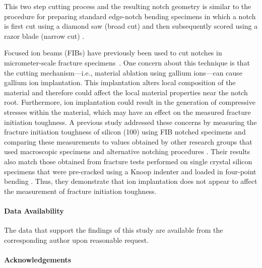 \documentclass[12pt,onecolumn]{article}
\begin{document}
\begin{bibunit}
This two step cutting process and the resulting notch geometry is similar to the procedure for preparing standard edge-notch bending specimens in which a notch is first cut using a diamond saw (broad cut) and then subsequently scored using a razor blade (narrow cut) \cite{rocha2006effect,kubler1997fracture,damani1996critical}.

Focused ion beams (FIBs) have previously been used to cut notches in micrometer-scale fracture specimens~\cite{jaya2015can,fett2008fracture,ochiai2014fracture,morishita2006fracture}.  One concern about this technique is that the cutting mechanism---i.e., material ablation using gallium ions---can cause gallium ion implantation. This implantation alters local composition of the material and therefore could affect the local material properties near the notch root. Furthermore, ion implantation could result in the generation of compressive stresses within the material, which may have an effect on the measured fracture initiation toughness. A previous study \cite{jaya2015can} addressed these concerns by measuring the fracture initiation toughness of silicon (100) using FIB notched specimens and comparing these measurements to values obtained by other research groups that used macroscopic specimens and alternative notching procedures \cite{ritchie2003failure}. Their results also match those obtained from fracture tests performed on single crystal silicon specimens that were pre-cracked using a Knoop indenter and loaded in four-point bending \cite{chen1980fracture}. Thus, they demonstrate that ion implantation does not appear to affect the measurement of fracture initiation toughness.

\singlespacing

\paragraph{Data Availability}

The data that support the findings of this study are available from the corresponding author upon reasonable request.

\putbib[refs]
% 

\processdelayedfloats

\end{bibunit}

\paragraph{Acknowledgements} %
\end{document}
